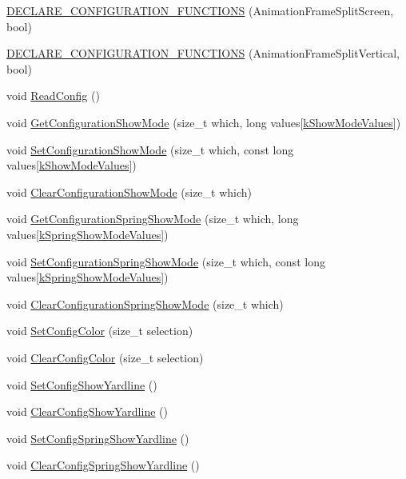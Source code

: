 \begin{DoxyCompactItemize}
\item 
\hyperlink{a00191_a39add52202ab1299f3f2fb12762a18b9}{D\-E\-C\-L\-A\-R\-E\-\_\-\-C\-O\-N\-F\-I\-G\-U\-R\-A\-T\-I\-O\-N\-\_\-\-F\-U\-N\-C\-T\-I\-O\-N\-S} (Animation\-Frame\-Split\-Screen, bool)
\item 
\hyperlink{a00191_a1634af7f4f9f3606099b501420d408a8}{D\-E\-C\-L\-A\-R\-E\-\_\-\-C\-O\-N\-F\-I\-G\-U\-R\-A\-T\-I\-O\-N\-\_\-\-F\-U\-N\-C\-T\-I\-O\-N\-S} (Animation\-Frame\-Split\-Vertical, bool)
\item 
void \hyperlink{a00191_a9440abccb89bacd8863562948fe06a64}{Read\-Config} ()
\item 
void \hyperlink{a00191_acfcfa727f9660f4d7eb0d3ee7d71e4f4}{Get\-Configuration\-Show\-Mode} (size\-\_\-t which, long values\mbox{[}\hyperlink{a00191_a9f04f33b4133efadaca3371489a3e3e0}{k\-Show\-Mode\-Values}\mbox{]})
\item 
void \hyperlink{a00191_a10e2f95aeedd16a7934badbd0d1d8fa7}{Set\-Configuration\-Show\-Mode} (size\-\_\-t which, const long values\mbox{[}\hyperlink{a00191_a9f04f33b4133efadaca3371489a3e3e0}{k\-Show\-Mode\-Values}\mbox{]})
\item 
void \hyperlink{a00191_a3ea3a157dc8aac53a5cc0ef7c98fc132}{Clear\-Configuration\-Show\-Mode} (size\-\_\-t which)
\item 
void \hyperlink{a00191_a82e8140bac7dbd8aefd2270bf90bdbc2}{Get\-Configuration\-Spring\-Show\-Mode} (size\-\_\-t which, long values\mbox{[}\hyperlink{a00191_ad4adeccc0bb8604edd3f05ef8e639fcd}{k\-Spring\-Show\-Mode\-Values}\mbox{]})
\item 
void \hyperlink{a00191_a594f1e68b0d6f4780721bc3e358dfdde}{Set\-Configuration\-Spring\-Show\-Mode} (size\-\_\-t which, const long values\mbox{[}\hyperlink{a00191_ad4adeccc0bb8604edd3f05ef8e639fcd}{k\-Spring\-Show\-Mode\-Values}\mbox{]})
\item 
void \hyperlink{a00191_a0ac3d07d81bcdb5f7d9e567d3a2247a2}{Clear\-Configuration\-Spring\-Show\-Mode} (size\-\_\-t which)
\item 
void \hyperlink{a00191_a8e117024f9137a2b91cb79ec709c700c}{Set\-Config\-Color} (size\-\_\-t selection)
\item 
void \hyperlink{a00191_a67d9b5e1079a712f7453b66e8cd180f0}{Clear\-Config\-Color} (size\-\_\-t selection)
\item 
void \hyperlink{a00191_acc7103c8f611f5953464b72b11f40a85}{Set\-Config\-Show\-Yardline} ()
\item 
void \hyperlink{a00191_a74c2e3e4c6cc66f4e171145c2c86d62d}{Clear\-Config\-Show\-Yardline} ()
\item 
void \hyperlink{a00191_ad95a644f19c43ace116585d304ed3f73}{Set\-Config\-Spring\-Show\-Yardline} ()
\item 
void \hyperlink{a00191_a1604ee464bf4a87ccee24cdf5349d2b6}{Clear\-Config\-Spring\-Show\-Yardline} ()
\end{DoxyCompactItemize}
